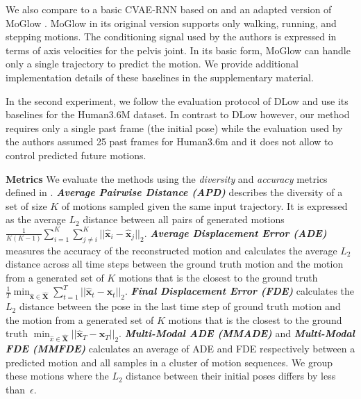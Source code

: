 \documentclass[10pt,twocolumn,letterpaper]{article}
\renewcommand{\hat}[1]{\widehat{#1}}
\renewcommand{\paragraph}[1]{\noindent\textbf{#1}\enskip}
\newcommand{\metric}[1]{\textit{\textbf{#1}}}
\begin{document}
We also compare to a basic CVAE-RNN based on \cite{yuan2020dlow} and an adapted version of MoGlow \cite{henter2020moglow}. MoGlow in its original version supports only walking, running, and stepping motions. The conditioning signal used by the authors is expressed in terms of axis velocities for the pelvis joint. In its basic form, MoGlow can handle only a single trajectory to predict the motion. We provide additional implementation details of these baselines in the supplementary material.

In the second experiment, we follow the evaluation protocol of DLow \cite{yuan2020dlow} and use its baselines for the Human3.6M \cite{ionescu2013human3} dataset. In contrast to DLow however, our method requires only a single past frame (the initial pose) while the evaluation used by the authors assumed 25 past frames for Human3.6m and it does not allow to control predicted future motions. 


\paragraph{Metrics}
We evaluate the methods using the \textit{diversity} and \textit{accuracy} metrics defined in \cite{yuan2020dlow}. 
    \metric{Average Pairwise Distance (APD)} describes the diversity of a set of size $K$ of motions sampled given the same input trajectory. It is expressed as the average $L_2$ distance between all pairs of generated motions \mbox{$\frac{1}{K(K-1)}\sum^K_{i=1}\sum^K_{j\neq i}||\hat{\mathbf{x}}_i - \hat{\mathbf{x}}_j||_2$}. 
    \metric{Average Displacement Error (ADE)} measures the accuracy of the reconstructed motion and calculates the average $L_2$ distance across all time steps between the ground truth motion and the motion from a generated set of $K$ motions that is the closest to the ground truth \mbox{$\frac{1}{T}\min_{\hat{\mathbf{x}} \in \hat{\mathbf{X}}}\sum_{t=1}^T||\hat{\mathbf{x}}_t - \mathbf{x}_t||_2$}. 
    \metric{Final Displacement Error (FDE)} calculates the $L_2$ distance between the pose in the last time step of ground truth motion and the motion from a generated set of $K$ motions that is the closest to the ground truth \mbox{$\min_{\hat{x} \in \hat{\mathbf{X}}}||\hat{\mathbf{x}}_T - \mathbf{x}_T||_2$}. 
    \metric{Multi-Modal ADE (MMADE)} and \metric{Multi-Modal FDE (MMFDE)} calculates an average of ADE and FDE respectively between a predicted motion and all samples in a cluster of motion sequences. We group these motions where the $L_2$ distance between their initial poses differs by less than~$\epsilon$.  
\end{document}
